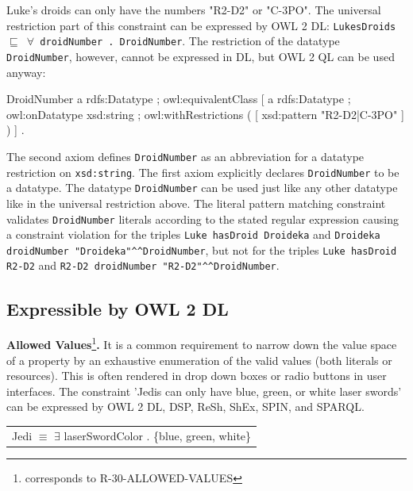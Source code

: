 \documentclass{llncs}
\newcommand{\ms}[1]{\texttt{#1}}
\newenvironment{DL}{
  \scriptsize
  \sffamily
  \vspace{0.3cm}
  \begin{tabular}{l}

}{
  \end{tabular}
  \linebreak
}
\begin{document}
Luke's droids can only have the numbers "R2-D2" or "C-3PO".
The universal restriction part of this constraint can be expressed by OWL 2 DL:
\ms{LukesDroids $\sqsubseteq$ $\forall$ droidNumber . DroidNumber}.
The restriction of the datatype \ms{DroidNumber}, however, cannot be expressed in DL, but OWL 2 QL can be used anyway:

\begin{ex}
DroidNumber 
    a rdfs:Datatype ;
    owl:equivalentClass [
        a rdfs:Datatype ;
        owl:onDatatype xsd:string ;
        owl:withRestrictions ( 
            [ xsd:pattern "R2-D2|C-3PO" ] ) ] .
\end{ex}

The second axiom defines \ms{DroidNumber} as an abbreviation for a datatype restriction on \ms{xsd:string}. 
The first axiom explicitly declares \ms{DroidNumber} to be a datatype. 
The datatype \ms{DroidNumber} can be used just like any other datatype like in the universal restriction above.
The literal pattern matching constraint validates \ms{DroidNumber} literals according to the stated regular expression causing a constraint violation for the triples 
\ms{Luke hasDroid Droideka} and \ms{Droideka droidNumber "Droideka"\textasciicircum{}\textasciicircum{}DroidNumber}, 
but not for the triples \ms{Luke hasDroid R2-D2} and \ms{R2-D2 droidNumber "R2-D2"\textasciicircum{}\textasciicircum{}DroidNumber}.

\subsection{Expressible by OWL 2 DL}
\label{sec:rdf-validation-requirements-without-reasoning-2}

\textbf{Allowed Values}\footnote{corresponds to R-30-ALLOWED-VALUES}\textbf{.}
It is a common requirement to narrow down the value space of a property by an exhaustive enumeration of the valid values (both literals or resources). This is often rendered in drop down boxes or radio buttons in user interfaces. 
The constraint 'Jedis can only have blue, green, or white laser swords' can be expressed by OWL 2 DL, DSP, ReSh, ShEx, SPIN, and SPARQL.

\begin{DL}
Jedi $\equiv$ $\exists$ laserSwordColor . \{blue, green, white\} \\
\end{DL}

%
\end{document}
